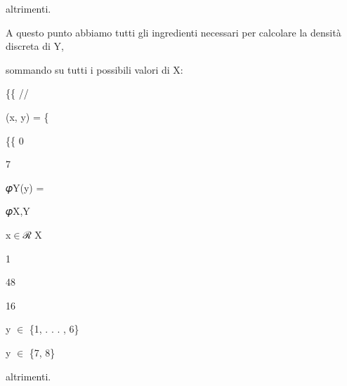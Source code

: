 \documentclass[a4paper,portrait,12pt]{article}
\begin{document}
\begin{flushleft}
altrimenti.
\end{flushleft}





\begin{flushleft}
A questo punto abbiamo tutti gli ingredienti necessari per calcolare la densit\`{a} discreta di Y,
\end{flushleft}


\begin{flushleft}
sommando su tutti i possibili valori di X:
\end{flushleft}





\{\{ //


\begin{flushleft}
(x, y) = \{
\end{flushleft}


\{\{ 0


7





\begin{flushleft}
𝜑Y(y) =
\end{flushleft}





\begin{flushleft}
𝜑X,Y
\end{flushleft}


\begin{flushleft}
x$\in$ℛ X
\end{flushleft}





1





48


16





\begin{flushleft}
y $\in$ \{1, . . . , 6\}
\end{flushleft}


\begin{flushleft}
y $\in$ \{7, 8\}
\end{flushleft}


\begin{flushleft}
altrimenti.
\end{flushleft}
\end{document}
